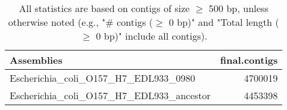 \documentclass[12pt,a4paper]{article}
\begin{document}
\begin{table}[ht]
\begin{center}
\caption{All statistics are based on contigs of size $\geq$ 500 bp, unless otherwise noted (e.g., "\# contigs ($\geq$ 0 bp)" and "Total length ($\geq$ 0 bp)" include all contigs).}
\begin{tabular}{|l*{1}{|r}|}
\hline
Assemblies & final.contigs \\ \hline
Escherichia\_coli\_O157\_H7\_EDL933\_0980 & 4700019 \\ \hline
Escherichia\_coli\_O157\_H7\_EDL933\_ancestor & 4453398 \\ \hline
\end{tabular}
\end{center}
\end{table}
\end{document}

